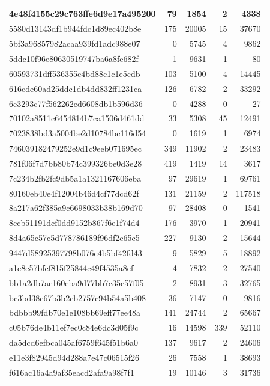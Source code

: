 \documentclass[]{article}
\begin{document}
\begin{table}[t]
\begin{tabular}{l|r|r|r|r}
\hline
4e48f4155c29c763ffe6d9e17a495200 & 79 & 1854 & 2 & 4338\\
\hline
5580d13143df1b944fdc1d89ec402b8e & 175 & 20005 & 15 & 37670\\
\hline
5bf3a96857982acaa939fd1adc988e07 & 0 & 5745 & 4 & 9862\\
\hline
5ddc10f96e80630519747ba6a8fe682f & 1 & 9631 & 1 & 80\\
\hline
60593731dff536355c4bd88c1c1e5cdb & 103 & 5100 & 4 & 14445\\
\hline
616cde60ad25ddc1db4dd832ff1231ca & 126 & 6782 & 2 & 33292\\
\hline
6e3293c77f562262ed6608db1b596d36 & 0 & 4288 & 0 & 27\\
\hline
70102a8511c6454814b7ca1506d461dd & 33 & 5308 & 45 & 12491\\
\hline
7023838bd3a5004be2d10784bc116d54 & 0 & 1619 & 1 & 6974\\
\hline
746039182479252e9d1c9eeb071695ec & 349 & 11902 & 2 & 23483\\
\hline
781f06f7d7bb80b74c399326be0d3e28 & 419 & 1419 & 14 & 3617\\
\hline
7c234b2fb2fc9db5a1a1321167606eba & 97 & 29619 & 1 & 69761\\
\hline
80160eb40e4f12004b46d4cf77dcd62f & 131 & 21159 & 2 & 117518\\
\hline
8a217a62f385a9c6698033b38b169d70 & 97 & 28408 & 0 & 1541\\
\hline
8ccb51191dcf0dd9152b867f6e1f74d4 & 176 & 3970 & 1 & 20941\\
\hline
8d4a65c57c5d778786189f96df2c65c5 & 227 & 9130 & 2 & 15644\\
\hline
9447d58925397798b076e4b5bf42fd43 & 9 & 5829 & 5 & 18892\\
\hline
a1c8e57bfcf815f25844c49f4535a8ef & 4 & 7832 & 2 & 27540\\
\hline
bb1a2db7ae160eba9d77bb7c35c57f05 & 2 & 8931 & 3 & 32765\\
\hline
bc3bd38c67b3b2cb2757c94b54a5b408 & 36 & 7147 & 0 & 9816\\
\hline
bdbbb99fdb70e1e108bb69eff77ee48a & 141 & 24744 & 2 & 65667\\
\hline
c05b76de4b11ef7ec0c84e6dc3d05f9c & 16 & 14598 & 339 & 52110\\
\hline
da5dcd6efbca045af6759f645f51b6a0 & 137 & 9617 & 2 & 24606\\
\hline
e11e3f82945d94d288a7e47c06515f26 & 26 & 7558 & 1 & 38693\\
\hline
f616ac16a4a9af35eacd2afa9a98f7f1 & 19 & 10146 & 3 & 31736\\

\end{tabular}
\end{table}
\end{document}
